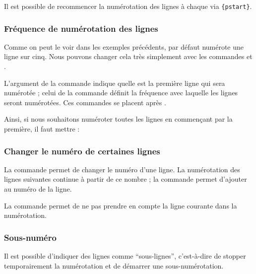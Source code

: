 \begin{plusloins}
Il est possible de recommencer la numérotation des lignes à chaque   via \verb={pstart}=.
\end{plusloins}

\subsubsection{Fréquence de numérotation des lignes}

Comme on peut le voir dans les exemples précédents, par défaut  numérote  une ligne sur cinq. Nous pouvons changer cela très simplement avec les commandes 
 et .

L'argument  de la commande  indique quelle est  la première ligne qui sera numérotée 
; celui de la commande  définit la fréquence avec laquelle les lignes seront numérotées. Ces commandes se placent après . 

Ainsi, si nous souhaitons numéroter toutes les lignes en commençant par la première, il faut mettre :

\begin{latexcode}
\end{latexcode}



\subsubsection{Changer le numéro de certaines lignes}

La commande  permet de changer le numéro d'une ligne. La numérotation des lignes suivantes  continue à partir de ce nombre ; la commande  permet d'ajouter  au numéro de la ligne.

La commande  permet de ne pas prendre en compte la ligne courante dans la numérotation.

\subsubsection{Sous-numéro}

Il est possible d'indiquer  des lignes comme \enquote{sous-lignes}, c'est-à-dire de stopper temporairement la numérotation et de démarrer une sous-numérotation.

